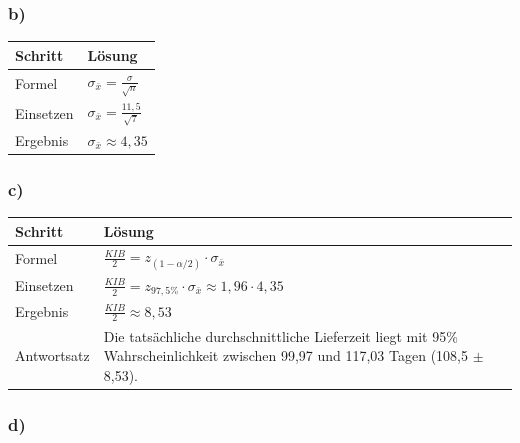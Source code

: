 \documentclass[
  11pt,
  ngerman,
  a4paper,
]{report}
\begin{document}
\hypertarget{b-16}{%
\subsubsection{b)}\label{b-16}}

\begin{table}[H]
\centering
\begin{tabular}{ll}
\toprule
\textbf{Schritt} & \textbf{Lösung}\\
\midrule
Formel & $\sigma_{\bar{x}}=\frac{\sigma}{\sqrt{n}}$\\
Einsetzen & $\sigma_{\bar{x}}=\frac{11{,}5}{\sqrt{7}}$\\
Ergebnis & $\sigma_{\bar{x}}\approx4{,}35$\\
\bottomrule
\end{tabular}
\end{table}

\hypertarget{c-12}{%
\subsubsection{c)}\label{c-12}}

\begin{table}[H]
\centering
\begin{tabular}{ll}
\toprule
\textbf{Schritt} & \textbf{Lösung}\\
\midrule
Formel & $\frac{\mathit{KIB}}{2} = z_{(1-\alpha/2)} \cdot \sigma_{\bar{x}}$\\
Einsetzen & $\frac{\mathit{KIB}}{2} = z_{97{,}5\%} \cdot \sigma_{\bar{x}} \approx 1{,}96 \cdot 4{,}35$\\
Ergebnis & $\frac{\mathit{KIB}}{2} \approx 8{,}53$\\
Antwortsatz & Die tatsächliche durchschnittliche Lieferzeit liegt mit 95\% Wahrscheinlichkeit zwischen 99,97 und 117,03 Tagen (108,5 $\pm$ 8,53).\\
\bottomrule
\end{tabular}
\end{table}

\hypertarget{d-6}{%
\subsubsection{d)}\label{d-6}}
\end{document}
